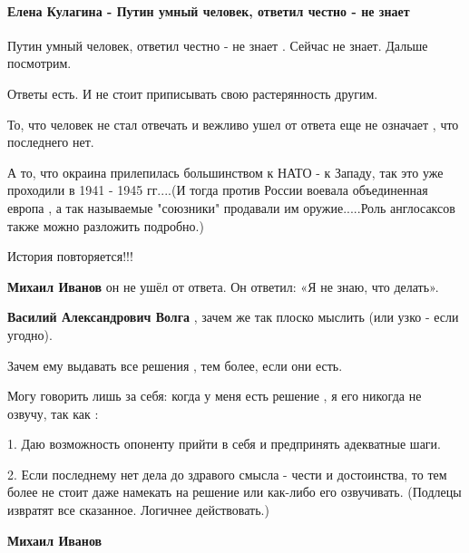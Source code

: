  
 
 
 
 
\paragraph{Елена Кулагина - Путин умный человек, ответил честно - не знает}

\begin{itemize} %

Путин умный человек, ответил честно - не знает . Сейчас не знает. Дальше посмотрим.


Ответы есть. И не стоит приписывать свою растерянность другим.

То, что человек не стал отвечать и вежливо ушел от ответа еще не означает , что
последнего нет.

А то, что окраина прилепилась большинством к НАТО - к Западу, так это уже
проходили в 1941 - 1945 гг....(И тогда против России воевала объединенная
европа , а так называемые "союзники" продавали им оружие.....Роль англосаксов
также можно разложить подробно.)

История повторяется!!!

\begin{itemize} %
\textbf{Михаил Иванов} он не ушёл от ответа. Он ответил: «Я не знаю, что делать».

\textbf{Василий Александрович Волга} , зачем же так плоско мыслить (или узко - если угодно).

Зачем ему выдавать все решения , тем более, если они есть.

Могу говорить лишь за себя: когда у меня есть решение , я его никогда не озвучу, так как :

1. Даю возможность опоненту прийти в себя и предпринять адекватные шаги.

2. Если последнему нет дела до здравого смысла - чести и достоинства, то тем
более не стоит даже намекать на решение или как-либо его озвучивать. (Подлецы
извратят все сказанное. Логичнее действовать.)

\textbf{Михаил Иванов} 


\end{itemize}
\end{itemize}
